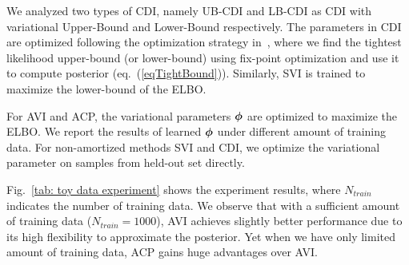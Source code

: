 We analyzed two types of CDI, namely UB-CDI and LB-CDI as CDI with variational Upper-Bound and Lower-Bound respectively.
The parameters in CDI are optimized following the optimization strategy in~\citep{jaakkola1999variational, vsingliar2006noisy}, where we find the tightest likelihood upper-bound (or lower-bound) using fix-point optimization and use it to compute posterior (eq.~(\ref{eqTightBound})). %
Similarly, SVI is trained to maximize the lower-bound of the ELBO.

For AVI and ACP,  the variational parameters $\bm{\phi}$ are optimized to maximize the ELBO. 
We report the results of learned $\bm{\phi}$ under different amount of training data. For non-amortized methods SVI and CDI, we optimize the variational parameter on samples from held-out set directly.



Fig.~\ref{tab: toy data experiment} shows the experiment results, where $N_{train}$ indicates the number of training data. 
We observe that with a sufficient amount of training data ($N_{train}=1000$), AVI achieves slightly better performance due to its high flexibility to approximate the posterior. Yet when we have only limited amount of training data, ACP gains huge advantages over AVI. %



